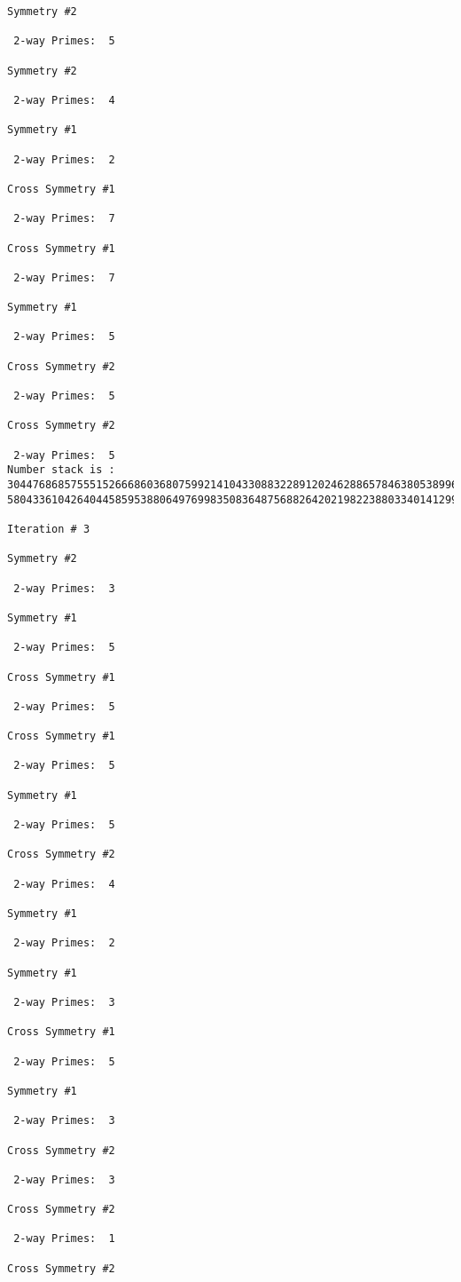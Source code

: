 {{{{\begin{verbatim}
Symmetry #2

 2-way Primes: 	5

Symmetry #2

 2-way Primes: 	4

Symmetry #1

 2-way Primes: 	2

Cross Symmetry #1

 2-way Primes: 	7

Cross Symmetry #1

 2-way Primes: 	7

Symmetry #1

 2-way Primes: 	5

Cross Symmetry #2

 2-way Primes: 	5

Cross Symmetry #2

 2-way Primes: 	5
Number stack is :
30447686857555152666860368075992141043308832289120246288657846380538996794608835958544046240163340857
58043361042640445859538806497699835083648756882642021982238803340141299570863068666251555758686744037

Iteration #	3

Symmetry #2

 2-way Primes: 	3

Symmetry #1

 2-way Primes: 	5

Cross Symmetry #1

 2-way Primes: 	5

Cross Symmetry #1

 2-way Primes: 	5

Symmetry #1

 2-way Primes: 	5

Cross Symmetry #2

 2-way Primes: 	4

Symmetry #1

 2-way Primes: 	2

Symmetry #1

 2-way Primes: 	3

Cross Symmetry #1

 2-way Primes: 	5

Symmetry #1

 2-way Primes: 	3

Cross Symmetry #2

 2-way Primes: 	3

Cross Symmetry #2

 2-way Primes: 	1

Cross Symmetry #2


\end{verbatim}}}}}
